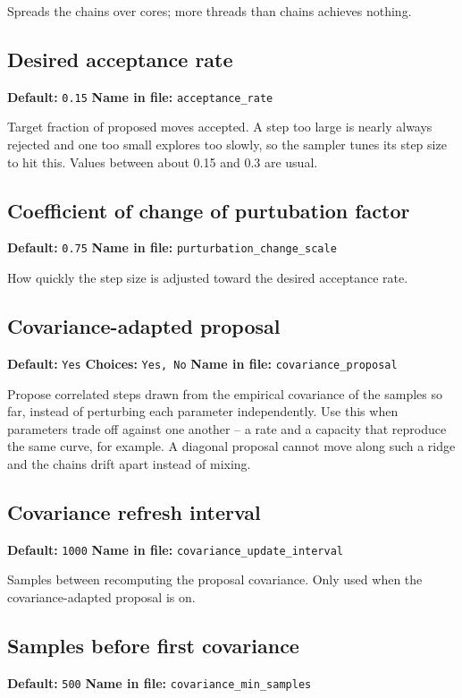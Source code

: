 \documentclass[11pt]{article}
\begin{document}
Spreads the chains over cores; more threads than chains achieves nothing.
\subsection{Desired acceptance rate}
{\small \textbf{Default:} \texttt{0.\allowbreak{}15} \quad\textbullet\quad \textbf{Name in file:} \texttt{acceptance\_\allowbreak{}rate}}

Target fraction of proposed moves accepted. A step too large is nearly always rejected and one too small explores too slowly, so the sampler tunes its step size to hit this. Values between about 0.15 and 0.3 are usual.
\subsection{Coefficient of change of purtubation factor}
{\small \textbf{Default:} \texttt{0.\allowbreak{}75} \quad\textbullet\quad \textbf{Name in file:} \texttt{purturbation\_\allowbreak{}change\_\allowbreak{}scale}}

How quickly the step size is adjusted toward the desired acceptance rate.
\subsection{Covariance-adapted proposal}
{\small \textbf{Default:} \texttt{Yes} \quad\textbullet\quad \textbf{Choices:} \texttt{Yes, No} \quad\textbullet\quad \textbf{Name in file:} \texttt{covariance\_\allowbreak{}proposal}}

Propose correlated steps drawn from the empirical covariance of the samples so far, instead of perturbing each parameter independently. Use this when parameters trade off against one another -- a rate and a capacity that reproduce the same curve, for example. A diagonal proposal cannot move along such a ridge and the chains drift apart instead of mixing.
\subsection{Covariance refresh interval}
{\small \textbf{Default:} \texttt{1000} \quad\textbullet\quad \textbf{Name in file:} \texttt{covariance\_\allowbreak{}update\_\allowbreak{}interval}}

Samples between recomputing the proposal covariance. Only used when the covariance-adapted proposal is on.
\subsection{Samples before first covariance}
{\small \textbf{Default:} \texttt{500} \quad\textbullet\quad \textbf{Name in file:} \texttt{covariance\_\allowbreak{}min\_\allowbreak{}samples}}
\end{document}
